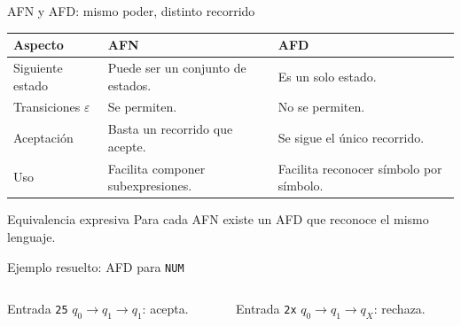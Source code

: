 \documentclass[11pt,spanish]{beamer}
\begin{document}
\begin{frame}{AFN y AFD: mismo poder, distinto recorrido}
\vfill

\begin{center}
\small
\renewcommand{\arraystretch}{1.25}
\begin{tabular}{|L{.25\textwidth}|L{.29\textwidth}|L{.32\textwidth}|}
\hline
\textbf{Aspecto} & \textbf{AFN} & \textbf{AFD} \tabularnewline
\hline
Siguiente estado & Puede ser un conjunto de estados. & Es un solo estado. \tabularnewline
\hline
Transiciones \(\varepsilon\) & Se permiten. & No se permiten. \tabularnewline
\hline
Aceptación & Basta un recorrido que acepte. & Se sigue el único recorrido. \tabularnewline
\hline
Uso & Facilita componer subexpresiones. & Facilita reconocer símbolo por símbolo. \tabularnewline
\hline
\end{tabular}
\end{center}

\bigskip
\begin{block}{Equivalencia expresiva}
Para cada AFN existe un AFD que reconoce el mismo lenguaje.
\end{block}

\vfill
\end{frame}

\begin{frame}{Ejemplo resuelto: AFD para \texttt{NUM}}
\vfill

\begin{center}
\end{center}

\bigskip
\begin{columns}[T,onlytextwidth]
\begin{column}{.48\textwidth}
\begin{block}{Entrada \texttt{25}}
\centering \(q_0\to q_1\to q_1\): acepta.
\end{block}
\end{column}
\begin{column}{.48\textwidth}
\begin{block}{Entrada \texttt{2x}}
\centering \(q_0\to q_1\to q_X\): rechaza.
\end{block}
\end{column}
\end{columns}

\vfill
\end{frame}
\end{document}
